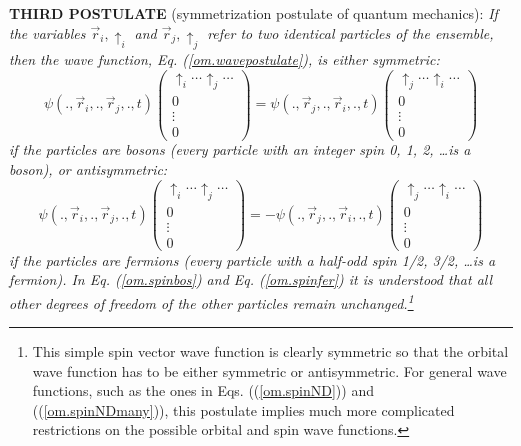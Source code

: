\documentclass[onecolumn,nofootinbib, secnumarabic, amsmath, nobibnotes,11pt,aps,pra]{revtex4-1}
\newcommand{\pref}[1]{(\ref{#1})}
\newcommand{\eref}[1]{Eq. (\ref{#1})}
\begin{document}
\noindent\textbf{THIRD POSTULATE} (symmetrization postulate of quantum mechanics): \textit{If the variables $\vec r_i,\uparrow_i$ and $\vec r_j,\uparrow_j$ refer to two identical particles of the ensemble, then the wave function, \eref{om.wavepostulate}, is either symmetric:
\begin{equation}
\label{om.spinbos}
\psi(.,\vec r_i,.,\vec r_j,.,t)\!\!\left(
\begin{array}{c}
\uparrow_i\ldots \uparrow_j\ldots\\ 0 \\\vdots\\ 0
\end{array}
\right) = \psi(.,\vec r_j,.,\vec r_i,.,t)\left(
\begin{array}{c}
\uparrow_j\ldots \uparrow_i\ldots\\ 0 \\\vdots\\ 0
\end{array}
\right)
\end{equation}
if the particles are bosons (every particle with an integer spin 0, 1, 2, \ldots is a boson), or antisymmetric:
\begin{equation}
\label{om.spinfer} \psi(.,\vec r_i,.,\vec r_j,.,t)\!\!\left(
\begin{array}{c}
\uparrow_i\ldots \uparrow_j\ldots\\ 0 \\\vdots\\ 0
\end{array}
\right)\!\! = -\psi(.,\vec r_j,.,\vec r_i,.,t)\!\!\left(
\begin{array}{c}
\uparrow_j\ldots \uparrow_i\ldots\\ 0 \\ \vdots \\ 0
\end{array}
\right)
\end{equation}
if the particles are fermions (every particle with a half-odd spin 1/2, 3/2, \ldots is a fermion). In \eref{om.spinbos} and \eref{om.spinfer} it is understood that all other degrees of freedom of the other particles remain unchanged.\footnote{This simple spin vector wave function is clearly symmetric so that the orbital wave function has to be either symmetric or antisymmetric. For general wave functions, such as the ones in Eqs. (\pref{om.spinND}) and (\pref{om.spinNDmany}), this postulate implies much more complicated restrictions on the possible orbital and spin wave functions.}} \\
\end{document}
